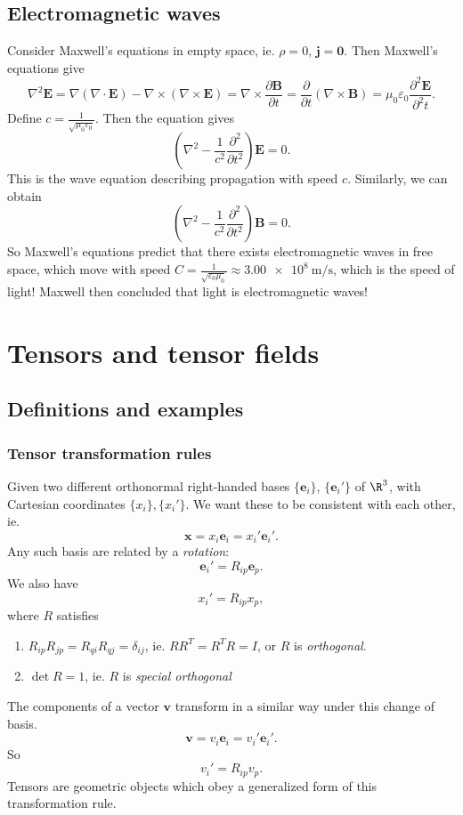 \documentclass[a4paper]{article}
\begin{document}
\subsection{Electromagnetic waves}
Consider Maxwell's equations in empty space, ie. $\rho = 0$, $\mathbf{j} = \mathbf{0}$. Then Maxwell's equations give
\[
  \nabla^2 \mathbf{E} = \nabla(\nabla\cdot \mathbf{E}) - \nabla\times (\nabla\times \mathbf{E}) = \nabla\times \frac{\partial \mathbf{B}}{\partial t} = \frac{\partial}{\partial t} (\nabla \times \mathbf{B}) = \mu_0\varepsilon_0 \frac{\partial^2 \mathbf{E}}{\partial^2 t}.
\]
Define $c = \frac{1}{\sqrt{\mu_0\varepsilon_0}}$. Then the equation gives
\[
  \left(\nabla^2 - \frac{1}{c^2}\frac{\partial^2}{\partial t^2}\right)\mathbf{E} = 0.
\]
This is the wave equation describing propagation with speed $c$. Similarly, we can obtain
\[
  \left(\nabla^2 - \frac{1}{c^2}\frac{\partial^2}{\partial t^2}\right)\mathbf{B} = 0.
\]
So Maxwell's equations predict that there exists electromagnetic waves in free space, which move with speed $C = \frac{1}{\sqrt{\varepsilon_0 \mu_0}} \approx \SI{3.00e8}{\meter\per\second}$, which is the speed of light! Maxwell then concluded that light is electromagnetic waves!

\section{Tensors and tensor fields}
\subsection{Definitions and examples}
\subsubsection{Tensor transformation rules}
Given two different orthonormal right-handed bases $\{\mathbf{e}_i\}$, $\{\mathbf{e}_i'\}$ of $\R^3$, with Cartesian coordinates $\{x_i\}, \{x_i'\}$. We want these to be consistent with each other, ie.
\[
  \mathbf{x} = x_i \mathbf{e}_i = x_i' \mathbf{e}_i'.
\]
Any such basis are related by a \emph{rotation}:
\[
  \mathbf{e}_i' = R_{ip} \mathbf{e}_p.
\]
We also have
\[
  x_i' = R_{ip} x_p,
\]
where $R$ satisfies
\begin{enumerate}
  \item $R_{ip}R_{jp} = R_{qi}R_{qj} = \delta_{ij}$, ie. $RR^T = R^TR = I$, or $R$ is \emph{orthogonal}.
  \item $\det R = 1$, ie. $R$ is \emph{special orthogonal}
\end{enumerate}
The components of a vector $\mathbf{v}$ transform in a similar way under this change of basis. 
\[
  \mathbf{v} = v_i \mathbf{e}_i = v_i' \mathbf{e}_i'.
\]
So
\[
  v_i' = R_{ip}v_p.
\]
Tensors are geometric objects which obey a generalized form of this transformation rule.
\end{document}
